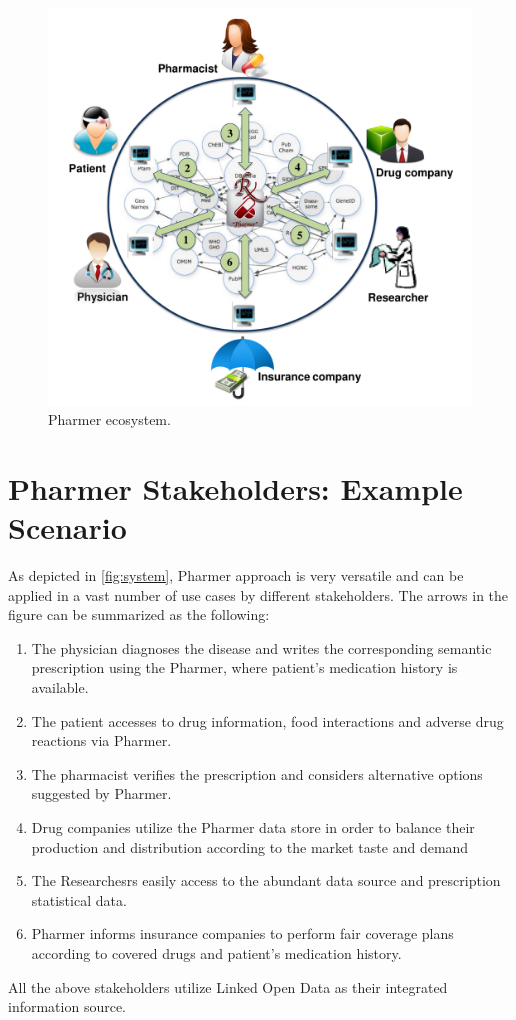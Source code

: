 \documentclass[conference]{IEEEtran}
\begin{document}
\begin{figure}[tb]
	\centering
		\includegraphics[width=1.0\columnwidth]{images/system.pdf}
	\caption{Pharmer ecosystem.}
	\label{fig:system}
\end{figure}

\section{Pharmer Stakeholders: Example Scenario}
\label{sec:example}
As depicted in \autoref{fig:system}, Pharmer approach is very versatile and can be applied in a vast number of use cases by different stakeholders.
The arrows in the figure can be summarized as the following:
\begin{enumerate}
\item The physician diagnoses the disease and writes the corresponding semantic prescription using the Pharmer, where patient's medication history is available.
\item The patient accesses to drug information, food interactions and adverse drug reactions via Pharmer.
\item The pharmacist verifies the prescription and considers alternative options suggested by Pharmer.
\item Drug companies utilize the Pharmer data store in order to balance their production and distribution according to the market taste and demand
\item The Researchesrs easily access to the abundant data source and prescription statistical data.
\item Pharmer informs insurance companies to perform fair coverage plans according to covered drugs and patient's medication history.
\end{enumerate}
All the above stakeholders utilize Linked Open Data as their integrated information source.
\end{document}
